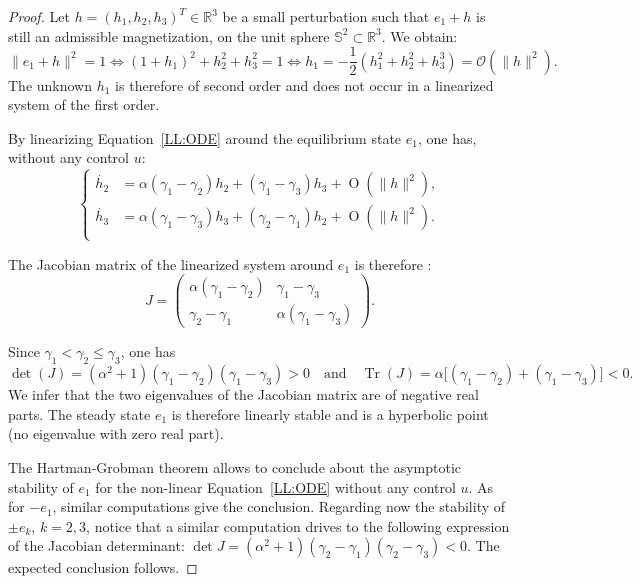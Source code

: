 \documentclass[10pt]{amsart}
\theoremstyle{definition}
\newcommand{\R} {\mathbb{R}}
\begin{document}
\begin{proof}
Let $h=(h_1, h_2, h_3)^T\in\R^3$ be a small perturbation such that $e_1+h$ is still an admissible magnetization, \ie on the unit sphere $\mathbb{S}^2\subset\R^3$. We obtain:
\begin{equation*}
\|e_1+h\|^2=1\iff (1+h_1)^2+h_2^2+h_3^2=1
\iff h_1=-\frac{1}{2}\left(h_1^2+h_2^2+h_3^3\right)=\mathcal{O}(\|h\|^2).
\end{equation*}
The unknown $h_1$ is therefore of second order and does not occur in a linearized system of the first order.

By linearizing Equation~\eqref{LL:ODE} around the equilibrium state $e_1$, one has, without any control $u$:
\begin{equation}
\left\{
\begin{aligned}
\dot{h_2} & =\alpha(\gamma_1-\gamma_2)h_2+(\gamma_1-\gamma_3)h_3+\operatorname{O}(\|h\|^2),\\
\dot{h_3} & =\alpha(\gamma_1-\gamma_3)h_3+(\gamma_2-\gamma_1)h_2+\operatorname{O}(\|h\|^2).\\
\end{aligned}
\right.
\end{equation}

The Jacobian matrix of the linearized system around $e_1$ is therefore :
\[ J=\begin{pmatrix}\alpha(\gamma_1-\gamma_2)&\gamma_1-\gamma_3\\
\gamma_2-\gamma_1&\alpha(\gamma_1-\gamma_3)\end{pmatrix}.\]

Since $\gamma_1<\gamma_2\leq\gamma_3$, one has
\[
\det (J)\!=\!(\alpha^2+1)(\gamma_1-\gamma_2)(\gamma_1-\gamma_3)\!>\!0\quad \text{and}\quad
\operatorname{Tr}(J)\!=\!\alpha\bigl[(\gamma_1-\gamma_2)+(\gamma_1-\gamma_3)\bigr]\!<\!0.
\]
We infer that the two eigenvalues of the Jacobian matrix are of negative real parts. The steady state $e_1$ is therefore linearly stable and is {a hyperbolic point} (no eigenvalue with zero real part).

{The Hartman-Grobman theorem} \cite{perko2013differential} allows to conclude about the asymptotic stability of $e_1$ for the non-linear Equation~\eqref{LL:ODE} without any control $u$. As for $- e_1$, similar computations give the conclusion. Regarding now the stability of $\pm e_k$, $k=2,3$, notice that a similar computation drives to the following expression of the Jacobian determinant: $\det J=(\alpha^2+1)(\gamma_2-\gamma_1)(\gamma_2-\gamma_3)<0$. The expected conclusion follows.
\end{proof}
\end{document}
